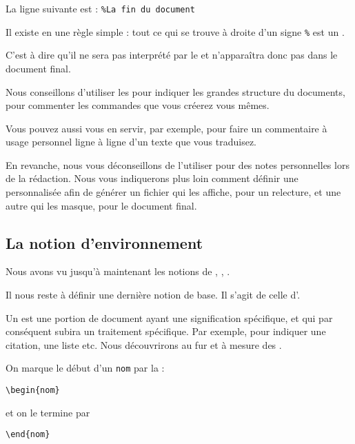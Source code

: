 La ligne suivante est : \verb|%La fin du document|

Il existe en \logiciel{\LaTex} une règle simple : tout ce qui se trouve à droite d'un signe \verb|%| est un .

C'est à dire qu'il ne sera pas interprété par le  et n'apparaîtra donc pas dans le document final. 

Nous conseillons d'utiliser les  pour indiquer les grandes structure du documents, pour commenter les commandes que vous créerez vous mêmes. 

Vous pouvez aussi vous en servir, par exemple, pour faire un commentaire à usage personnel ligne à ligne d'un texte que vous traduisez.

En revanche, nous vous déconseillons de l'utiliser pour des notes personnelles lors de la rédaction. Nous vous indiquerons plus loin  comment définir une  personnalisée afin de générer un fichier qui les affiche, pour un relecture, et une autre qui les masque, pour le document final.



\subsection{La notion d'environnement }

Nous avons vu jusqu'à maintenant les notions de  , , . 

Il nous reste à définir une dernière notion de base. Il s'agit de celle d'.

Un  est une portion de document ayant une signification spécifique, et qui par conséquent subira un traitement spécifique. Par exemple, pour indiquer une citation, une liste etc. Nous découvrirons au fur et à mesure  des . 


On marque le début d'un  \verb|nom| par la  :

\begin{verbatim}
\begin{nom}
\end{verbatim}

et on le termine par 
\begin{verbatim}
\end{nom}
\end{verbatim}

